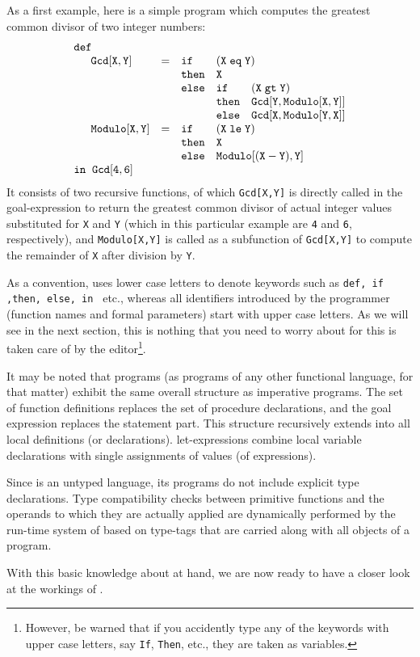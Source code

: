 As a first example, here is a simple \kir program which computes the
{\mys greatest common divisor} of two integer numbers:
$$
\begin{array}{lclll}
{\tt def} && \\
\phantom{{\sc in}\;\;}{\tt Gcd[X, Y]}&=& {\tt if}&
\multicolumn{2}{l}{
{\tt (X\; eq\;Y)}} \\
&& {\tt then}& {\tt X} \\
&& {\tt else}& {\tt if}&{\tt (X \; gt\; Y)}\\
&& & {\tt then}&{\tt Gcd[Y, Modulo[X, Y]]}\\
&& & {\tt else}&{\tt Gcd[X, Modulo[Y, X]]}\\
\phantom{{\sc in}\;\;}{\tt Modulo[X, Y]}&=& {\tt if}&
\multicolumn{2}{l}{
{\tt (X\; le\; Y)}
}\\
&& {\tt then}& {\tt X} \\
&&  {\tt else}&
\multicolumn{2}{l}{{\tt Modulo[(X - Y), Y]}}
\\ \multicolumn{3}{l}{{\tt in\;\;Gcd[4,6]}}
\end{array}
$$
It consists of two recursive functions, of which {\tt Gcd[X,Y]} 
is directly called in the goal-expression to
return the greatest common divisor of actual integer
values substituted for {\tt X} and {\tt Y} (which in this 
particular example are {\tt 4} and {\tt 6}, respectively),
and {\tt Modulo[X,Y]} is called
as a subfunction of {\tt Gcd[X,Y]} to compute the remainder of {\tt X}
after division by {\tt Y}.

As a convention, \kir uses lower case letters to denote {\mys keywords}
such as {\tt def, if ,then, else, in } etc., whereas all identifiers
introduced by the programmer (function names and formal parameters) 
start with upper case letters. As we will see in the next section,
this is nothing that you need to worry about for this is taken care of
by the \pired editor\footnote{However, be warned that if you accidently
type any of the keywords with upper case letters, say {\tt If}, {\tt Then}, etc.,
they are taken as variables.}.

It may be noted that \kir programs (as programs of any other functional
language, for that matter) exhibit the same overall structure
as imperative
programs. The set of function definitions replaces the set of
procedure declarations, and the goal expression replaces the statement
part. This structure recursively extends into all local definitions (or
declarations). {\sc let}-expressions combine local {\mys variable declarations}
with {\mys single assignments} of values (of expressions). 

Since \kir is an {\mys untyped language}, its programs do not include
explicit type declarations.
Type compatibility checks between primitive functions and the
operands to which they are actually applied are dynamically
performed by the run-time
system of \pired based on type-tags that are carried along with all
objects of a program.   

With this basic knowledge about \kir at hand, we are now ready to have
a closer look at the workings of \pired.
